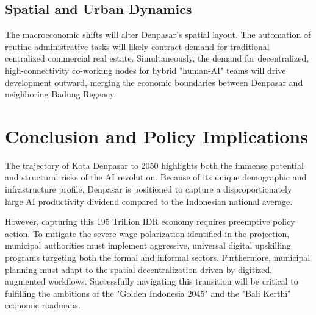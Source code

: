 \documentclass[11pt, a4paper]{article}
\begin{document}
\subsection{Spatial and Urban Dynamics}
The macroeconomic shifts will alter Denpasar's spatial layout. The automation of routine administrative tasks will likely contract demand for traditional centralized commercial real estate. Simultaneously, the demand for decentralized, high-connectivity co-working nodes for hybrid "human-AI" teams will drive development outward, merging the economic boundaries between Denpasar and neighboring Badung Regency.
  
  \section{Conclusion and Policy Implications}
  The trajectory of Kota Denpasar to 2050 highlights both the immense potential and structural risks of the AI revolution. Because of its unique demographic and infrastructure profile, Denpasar is positioned to capture a disproportionately large AI productivity dividend compared to the Indonesian national average.
  
  However, capturing this 195 Trillion IDR economy requires preemptive policy action. To mitigate the severe wage polarization identified in the projection, municipal authorities must implement aggressive, universal digital upskilling programs targeting both the formal and informal sectors. Furthermore, municipal planning must adapt to the spatial decentralization driven by digitized, augmented workflows. Successfully navigating this transition will be critical to fulfilling the ambitions of the "Golden Indonesia 2045" and the "Bali Kerthi" economic roadmaps.
  
\end{document}
